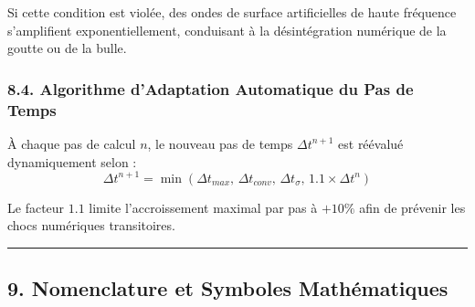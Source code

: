 \documentclass[
  french,
]{article}
\begin{document}
Si cette condition est violée, des ondes de surface artificielles de
haute fréquence s'amplifient exponentiellement, conduisant à la
désintégration numérique de la goutte ou de la bulle.

\subsubsection{8.4. Algorithme d'Adaptation Automatique du Pas de
Temps}\label{algorithme-dadaptation-automatique-du-pas-de-temps}

À chaque pas de calcul \(n\), le nouveau pas de temps \(\Delta t^{n+1}\)
est réévalué dynamiquement selon :
\[\Delta t^{n+1} = \min \left( \Delta t_{max}, \, \Delta t_{conv}, \, \Delta t_\sigma, \, 1.1 \times \Delta t^n \right)\]

Le facteur \(1.1\) limite l'accroissement maximal par pas à \(+10\%\)
afin de prévenir les chocs numériques transitoires.

\begin{center}\rule{0.5\linewidth}{0.5pt}\end{center}

\subsection{9. Nomenclature et Symboles
Mathématiques}\label{nomenclature-et-symboles-mathuxe9matiques}
\end{document}
